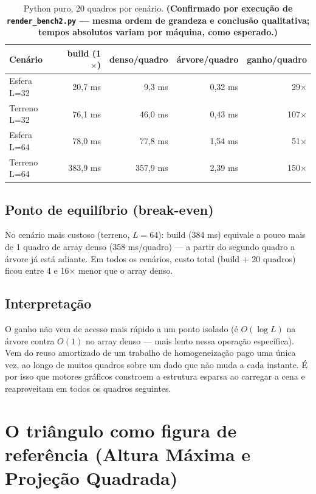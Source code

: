 \documentclass[11pt,a4paper]{article}
\begin{document}
\begin{table}[h]
\centering
\begin{tabular}{lrrrr}
\toprule
Cenário & build (1$\times$) & denso/quadro & árvore/quadro & ganho/quadro \\
\midrule
Esfera L=32  & 20,7 ms  & 9,3 ms   & 0,32 ms & 29$\times$  \\
Terreno L=32 & 76,1 ms  & 46,0 ms  & 0,43 ms & 107$\times$ \\
Esfera L=64  & 78,0 ms  & 77,8 ms  & 1,54 ms & 51$\times$  \\
Terreno L=64 & 383,9 ms & 357,9 ms & 2,39 ms & 150$\times$ \\
\bottomrule
\end{tabular}
\caption{Python puro, 20 quadros por cenário. \textbf{(Confirmado por execução de \texttt{render\_bench2.py} --- mesma ordem de grandeza e conclusão qualitativa; tempos absolutos variam por máquina, como esperado.)}}
\end{table}

\subsection{Ponto de equilíbrio (break-even)}

No cenário mais custoso (terreno, $L=64$): build (384 ms) equivale a pouco mais de 1 quadro de array denso (358 ms/quadro) --- a partir do segundo quadro a árvore já está adiante. Em todos os cenários, custo total (build + 20 quadros) ficou entre 4 e 16$\times$ menor que o array denso.

\subsection{Interpretação}

O ganho não vem de acesso mais rápido a um ponto isolado (é $O(\log L)$ na árvore contra $O(1)$ no array denso --- mais lento nessa operação específica). Vem do reuso amortizado de um trabalho de homogeneização pago uma única vez, ao longo de muitos quadros sobre um dado que não muda a cada instante. É por isso que motores gráficos constroem a estrutura esparsa ao carregar a cena e reaproveitam em todos os quadros seguintes.

\bigskip
\noindent\hrulefill

\section{O triângulo como figura de referência (Altura Máxima e Projeção Quadrada)}
\end{document}
